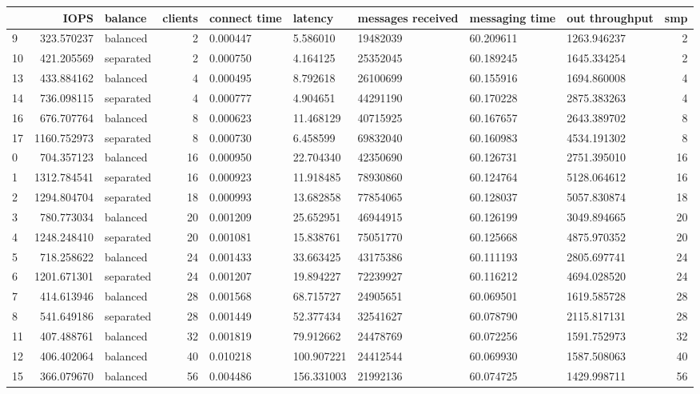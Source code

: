 \begin{tabular}{lrlrlllllr}
\toprule
 & IOPS & balance & clients & connect time & latency & messages received & messaging time & out throughput & smp \\
\midrule
9 & 323.570237 & balanced & 2 & 0.000447 & 5.586010 & 19482039 & 60.209611 & 1263.946237 & 2 \\
10 & 421.205569 & separated & 2 & 0.000750 & 4.164125 & 25352045 & 60.189245 & 1645.334254 & 2 \\
13 & 433.884162 & balanced & 4 & 0.000495 & 8.792618 & 26100699 & 60.155916 & 1694.860008 & 4 \\
14 & 736.098115 & separated & 4 & 0.000777 & 4.904651 & 44291190 & 60.170228 & 2875.383263 & 4 \\
16 & 676.707764 & balanced & 8 & 0.000623 & 11.468129 & 40715925 & 60.167657 & 2643.389702 & 8 \\
17 & 1160.752973 & separated & 8 & 0.000730 & 6.458599 & 69832040 & 60.160983 & 4534.191302 & 8 \\
0 & 704.357123 & balanced & 16 & 0.000950 & 22.704340 & 42350690 & 60.126731 & 2751.395010 & 16 \\
1 & 1312.784541 & separated & 16 & 0.000923 & 11.918485 & 78930860 & 60.124764 & 5128.064612 & 16 \\
2 & 1294.804704 & separated & 18 & 0.000993 & 13.682858 & 77854065 & 60.128037 & 5057.830874 & 18 \\
3 & 780.773034 & balanced & 20 & 0.001209 & 25.652951 & 46944915 & 60.126199 & 3049.894665 & 20 \\
4 & 1248.248410 & separated & 20 & 0.001081 & 15.838761 & 75051770 & 60.125668 & 4875.970352 & 20 \\
5 & 718.258622 & balanced & 24 & 0.001433 & 33.663425 & 43175386 & 60.111193 & 2805.697741 & 24 \\
6 & 1201.671301 & separated & 24 & 0.001207 & 19.894227 & 72239927 & 60.116212 & 4694.028520 & 24 \\
7 & 414.613946 & balanced & 28 & 0.001568 & 68.715727 & 24905651 & 60.069501 & 1619.585728 & 28 \\
8 & 541.649186 & separated & 28 & 0.001449 & 52.377434 & 32541627 & 60.078790 & 2115.817131 & 28 \\
11 & 407.488761 & balanced & 32 & 0.001819 & 79.912662 & 24478769 & 60.072256 & 1591.752973 & 32 \\
12 & 406.402064 & balanced & 40 & 0.010218 & 100.907221 & 24412544 & 60.069930 & 1587.508063 & 40 \\
15 & 366.079670 & balanced & 56 & 0.004486 & 156.331003 & 21992136 & 60.074725 & 1429.998711 & 56 \\
\bottomrule
\end{tabular}

